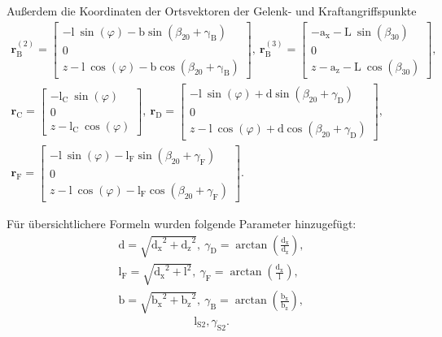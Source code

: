 \documentclass[]{scrartcl}
\begin{document}
Außerdem die Koordinaten der Ortsvektoren der Gelenk- und Kraftangriffspunkte
\begin{equation}
	\begin{gathered}
		\mathbf{r}_{\mathrm{B}}^{(2)} = \begin{bmatrix}
			-\mathrm{l} ~ \sin(\varphi) - \mathrm{b}\sin(\beta_{\mathrm{20}} + \mathrm{\gamma_{B}}) \\
			0 \\
			z - \mathrm{l} ~ \cos(\varphi)- \mathrm{b}\cos(\beta_{\mathrm{20}} + \mathrm{\gamma_{B}})
		\end{bmatrix}, \ 
		\mathbf{r}_{\mathrm{B}}^{(3)} = \begin{bmatrix}
			-\mathrm{a_x} - \mathrm{L} ~ \sin(\beta_{30}) \\
			0 \\
			z - \mathrm{a_z} - \mathrm{L} ~ \cos(\beta_{30})
		\end{bmatrix}, \\
		\mathbf{r}_{\mathrm{C}} = \begin{bmatrix}
			-\mathrm{l_C} ~ \sin(\varphi) \\
			0 \\
			z - \mathrm{l_C} ~ \cos(\varphi)
		\end{bmatrix}, \
		\mathbf{r}_{\mathrm{D}} = \begin{bmatrix}
			-\mathrm{l} ~ \sin(\varphi) + \mathrm{d}\sin(\beta_{\mathrm{20}} + \gamma_{\mathrm{D}})\\
			0 \\
			z - \mathrm{l} ~ \cos(\varphi) + \mathrm{d}\cos(\beta_{\mathrm{20}} + \gamma_{\mathrm{D}})
		\end{bmatrix}, \\
		\mathbf{r}_{\mathrm{F}} = \begin{bmatrix}
			-\mathrm{l} ~ \sin(\varphi) - \mathrm{l_F}\sin(\beta_{\mathrm{20}} + \gamma_{\mathrm{F}})\\
			0 \\
			z - \mathrm{l} ~ \cos(\varphi) - \mathrm{l_F}\cos(\beta_{\mathrm{20}} + \gamma_{\mathrm{F}})
		\end{bmatrix}.
	\end{gathered}
\end{equation}

Für übersichtlichere Formeln wurden folgende Parameter hinzugefügt:
\begin{equation}
\begin{aligned}
\mathrm{d} = \sqrt{\mathrm{d_x}^2 + \mathrm{d_z}^2}, \ \gamma_{\mathrm{D}} = \arctan\left(\frac{\mathrm{d_x}}{\mathrm{d_z}}\right), \\
\mathrm{l_F} = \sqrt{\mathrm{d_x}^2 + \mathrm{l}^2}, \ \gamma_{\mathrm{F}} = \arctan\left(\frac{\mathrm{d_x}}{\mathrm{l}}\right), \\
\mathrm{b} = \sqrt{\mathrm{b_x}^2 + \mathrm{b_z}^2}, \ \gamma_{\mathrm{B}} = \arctan\left(\frac{\mathrm{b_x}}{\mathrm{b_z}}\right),
\end{aligned}
\end{equation}
$$
\mathrm{l_{S2}}, \gamma_{\mathrm{S2}}.
$$
\end{document}

